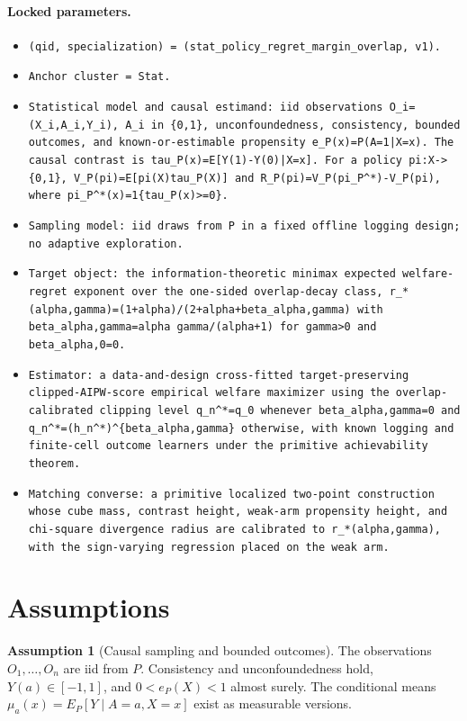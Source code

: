 \documentclass[11pt]{article}
\theoremstyle{definition}
\newtheorem{assumption}{Assumption}
\theoremstyle{plain}
\theoremstyle{remark}
\begin{document}
\paragraph{Locked parameters.}
\begin{itemize}[leftmargin=*]
  \item \texttt{(qid, specialization) = (stat\_policy\_regret\_margin\_overlap, v1).}
  \item \texttt{Anchor cluster = Stat.}
  \item \texttt{Statistical model and causal estimand: iid observations O\_i=(X\_i,A\_i,Y\_i), A\_i in \{0,1\}, unconfoundedness, consistency, bounded outcomes, and known-or-estimable propensity e\_P(x)=P(A=1|X=x). The causal contrast is tau\_P(x)=E[Y(1)-Y(0)|X=x]. For a policy pi:X->\{0,1\}, V\_P(pi)=E[pi(X)tau\_P(X)] and R\_P(pi)=V\_P(pi\_P\textasciicircum{}*)-V\_P(pi), where pi\_P\textasciicircum{}*(x)=1\{tau\_P(x)>=0\}.}
  \item \texttt{Sampling model: iid draws from P in a fixed offline logging design; no adaptive exploration.}
  \item \texttt{Target object: the information-theoretic minimax expected welfare-regret exponent over the one-sided overlap-decay class, r\_*(alpha,gamma)=(1+alpha)/(2+alpha+beta\_{alpha,gamma}) with beta\_{alpha,gamma}=alpha gamma/(alpha+1) for gamma>0 and beta\_{alpha,0}=0.}
  \item \texttt{Estimator: a data-and-design cross-fitted target-preserving clipped-AIPW-score empirical welfare maximizer using the overlap-calibrated clipping level q\_n\textasciicircum{}*=q\_0 whenever beta\_{alpha,gamma}=0 and q\_n\textasciicircum{}*=(h\_n\textasciicircum{}*)\textasciicircum{}\{beta\_{alpha,gamma}\} otherwise, with known logging and finite-cell outcome learners under the primitive achievability theorem.}
  \item \texttt{Matching converse: a primitive localized two-point construction whose cube mass, contrast height, weak-arm propensity height, and chi-square divergence radius are calibrated to r\_*(alpha,gamma), with the sign-varying regression placed on the weak arm.}
\end{itemize}

\section{Assumptions}
\begin{assumption}[Causal sampling and bounded outcomes]\label{ass:causal-sampling}
The observations \(O_1,\ldots,O_n\) are iid from \(P\).  Consistency and
unconfoundedness hold, \(Y(a)\in[-1,1]\), and \(0<e_P(X)<1\) almost surely.
The conditional means \(\mu_a(x)=E_P[Y\mid A=a,X=x]\) exist as measurable
versions.
\end{assumption}
\end{document}
